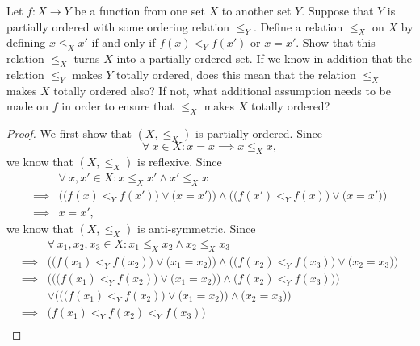 \begin{exercise}\label{ex 8.5.5}
    Let \(f : X \to Y\) be a function from one set \(X\) to another set \(Y\).
    Suppose that \(Y\) is partially ordered with some ordering relation \(\leq_Y\).
    Define a relation \(\leq_X\) on \(X\) by defining \(x \leq_X x'\) if and only if \(f(x) <_Y f(x')\) or \(x = x'\).
    Show that this relation \(\leq_X\) turns \(X\) into a partially ordered set.
    If we know in addition that the relation \(\leq_Y\) makes \(Y\) totally ordered, does this mean that the relation \(\leq_X\) makes \(X\) totally ordered also?
    If not, what additional assumption needs to be made on \(f\) in order to ensure that \(\leq_X\) makes \(X\) totally ordered?
\end{exercise}

\begin{proof}
    We first show that \((X, \leq_X)\) is partially ordered.
    Since
    \[
        \forall\ x \in X : x = x \implies x \leq_X x,
    \]
    we know that \((X, \leq_X)\) is reflexive.
    Since
    \begin{align*}
                 & \forall\ x, x' \in X : x \leq_X x' \land x' \leq_X x                                                                    \\
        \implies & \Big(\big(f(x) <_Y f(x')\big) \lor \big(x = x'\big)\Big) \land \Big(\big(f(x') <_Y f(x)\big) \lor \big(x = x'\big)\Big) \\
        \implies & x = x',
    \end{align*}
    we know that \((X, \leq_X)\) is anti-symmetric.
    Since
    \begin{align*}
                 & \forall\ x_1, x_2, x_3 \in X : x_1 \leq_X x_2 \land x_2 \leq_X x_3                                                                  \\
        \implies & \Big(\big(f(x_1) <_Y f(x_2)\big) \lor \big(x_1 = x_2\big)\Big) \land \Big(\big(f(x_2) <_Y f(x_3)\big) \lor \big(x_2 = x_3\big)\Big) \\
        \implies & \bigg(\Big(\big(f(x_1) <_Y f(x_2)\big) \lor \big(x_1 = x_2\big)\Big) \land \big(f(x_2) <_Y f(x_3)\big)\bigg)                        \\
                 & \lor \bigg(\Big(\big(f(x_1) <_Y f(x_2)\big) \lor \big(x_1 = x_2\big)\Big) \land \big(x_2 = x_3\big)\bigg)                           \\
        \implies & \big(f(x_1) <_Y f(x_2) <_Y f(x_3)\big)                                                                                              \\

\end{align*}
\end{proof}
